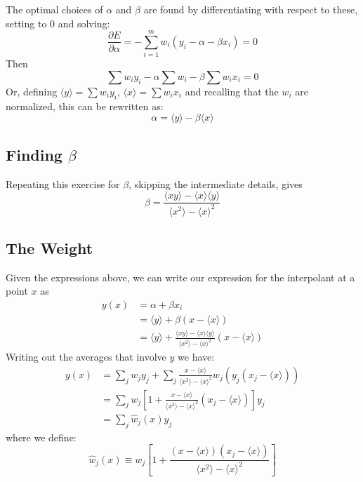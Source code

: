 \documentclass[oneside]{tufte-handout}
\begin{document}
\begin{fullwidth}
The optimal choices of $\alpha$ and $\beta$ are found by differentiating with respect to these, setting to 0 and solving:
\begin{equation*}
\frac{\partial E}{\partial \alpha} = - \sum_{i=1}^m w_i (y_i - \alpha - \beta x_i) = 0
\end{equation*}
Then
\begin{equation*}
\sum w_i y_i - \alpha \sum w_i - \beta \sum w_i x_i = 0
\end{equation*}
Or, defining $\langle y \rangle = \sum w_i y_i$, $\langle x \rangle = \sum w_i x_i$ and recalling that the $w_i$ are normalized, this can be rewritten as:
\begin{equation*}
\alpha = \langle y \rangle - \beta \langle x \rangle
\end{equation*}

\subsection{Finding $\beta$}

Repeating this exercise for $\beta$, skipping the intermediate details, gives
\begin{equation*}
\beta = \frac{\langle x y \rangle - \langle x \rangle \langle y \rangle}{\langle x^2 \rangle - \langle x \rangle^2}
\end{equation*}

\subsection{The Weight}

Given the expressions above, we can write our expression for the interpolant at a point $x$ as
\begin{align*}
y(x) &= \alpha + \beta x_i \\
       &= \langle y \rangle + \beta ( x - \langle x \rangle) \\
       &= \langle y \rangle + \frac{\langle x y \rangle - \langle x \rangle \langle y \rangle}{\langle x^2 \rangle - \langle x \rangle^2} (x - \langle x \rangle)
\end{align*}
Writing out the averages that involve $y$ we have:
\begin{align*}
y(x) &= \sum_j w_j y_j + \sum_j \frac{x - \langle x \rangle}{\langle x^2 \rangle - \langle x \rangle^2} w_j (y_j(x_j - \langle x \rangle)) \\
       &= \sum_j w_j \left[1 + \frac{x - \langle x \rangle}{\langle x^2 \rangle - \langle x \rangle^2}(x_j - \langle x \rangle) \right] y_j \\
       &= \sum_j \hat{w}_j(x) y_j
\end{align*}
where we define:
\begin{equation*}
\hat{w}_j(x) \equiv w_j\left[ 1 + \frac{(x - \langle x \rangle)(x_j - \langle x \rangle)}{\langle x^2 \rangle - \langle x \rangle^2} \right]
\end{equation*}


\end{fullwidth}
\end{document}
